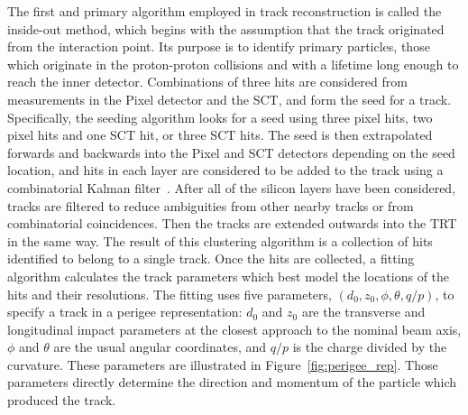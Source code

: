The first and primary algorithm employed in track reconstruction is called the inside-out method, which begins with the assumption that the track originated from the interaction point.
Its purpose is to identify primary particles, those which originate in the proton-proton collisions and with a lifetime long enough to reach the inner detector.
Combinations of three hits are considered from measurements in the Pixel detector and the \ac{SCT}, and form the seed for a track. 
Specifically, the seeding algorithm looks for a seed using three pixel hits, two pixel hits and one \ac{SCT} hit, or three \ac{SCT} hits.
The seed is then extrapolated forwards and backwards into the Pixel and \ac{SCT} detectors depending on the seed location, and hits in each layer are considered to be added to the track using a combinatorial Kalman filter~\cite{tracking_performance}.
After all of the silicon layers have been considered, tracks are filtered to reduce ambiguities from other nearby tracks or from combinatorial coincidences.
Then the tracks are extended outwards into the \ac{TRT} in the same way.
The result of this clustering algorithm is a collection of hits identified to belong to a single track.
Once the hits are collected, a fitting algorithm calculates the track parameters which best model the locations of the hits and their resolutions.
The fitting uses five parameters, $(d_0, z_0, \phi, \theta, q/p)$, to specify a track in a perigee representation: $d_0$ and $z_0$ are the transverse and longitudinal impact parameters at the closest approach to the nominal beam axis, $\phi$ and $\theta$ are the usual angular coordinates, and $q/p$ is the charge divided by the curvature.
These parameters are illustrated in Figure~\ref{fig:perigee_rep}.
Those parameters directly determine the direction and momentum of the particle which produced the track.


